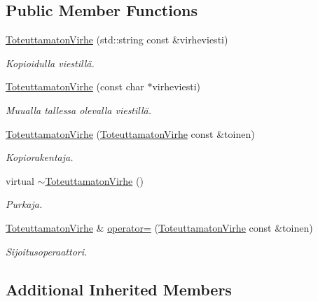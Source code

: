 \subsection*{Public Member Functions}
\begin{DoxyCompactItemize}
\item 
\hyperlink{class_julkinen_1_1_toteuttamaton_virhe_a99a4a348aae94e693dd7f00e1972a5d5}{Toteuttamaton\+Virhe} (std\+::string const \&virheviesti)
\begin{DoxyCompactList}\small\item\em Kopioidulla viestillä. \end{DoxyCompactList}\item 
\hyperlink{class_julkinen_1_1_toteuttamaton_virhe_a202f4895091f54a386b180a948e60340}{Toteuttamaton\+Virhe} (const char $\ast$virheviesti)
\begin{DoxyCompactList}\small\item\em Muualla tallessa olevalla viestillä. \end{DoxyCompactList}\item 
\hyperlink{class_julkinen_1_1_toteuttamaton_virhe_a66deecd233993b61cfa7a72952235872}{Toteuttamaton\+Virhe} (\hyperlink{class_julkinen_1_1_toteuttamaton_virhe}{Toteuttamaton\+Virhe} const \&toinen)
\begin{DoxyCompactList}\small\item\em Kopiorakentaja. \end{DoxyCompactList}\item 
virtual \hyperlink{class_julkinen_1_1_toteuttamaton_virhe_a433af1932c8db53951d2d360a3fe4fab}{$\sim$\+Toteuttamaton\+Virhe} ()
\begin{DoxyCompactList}\small\item\em Purkaja. \end{DoxyCompactList}\item 
\hyperlink{class_julkinen_1_1_toteuttamaton_virhe}{Toteuttamaton\+Virhe} \& \hyperlink{class_julkinen_1_1_toteuttamaton_virhe_a35e5217128b97768e4bbccea860362f1}{operator=} (\hyperlink{class_julkinen_1_1_toteuttamaton_virhe}{Toteuttamaton\+Virhe} const \&toinen)
\begin{DoxyCompactList}\small\item\em Sijoitusoperaattori. \end{DoxyCompactList}\end{DoxyCompactItemize}
\subsection*{Additional Inherited Members}


